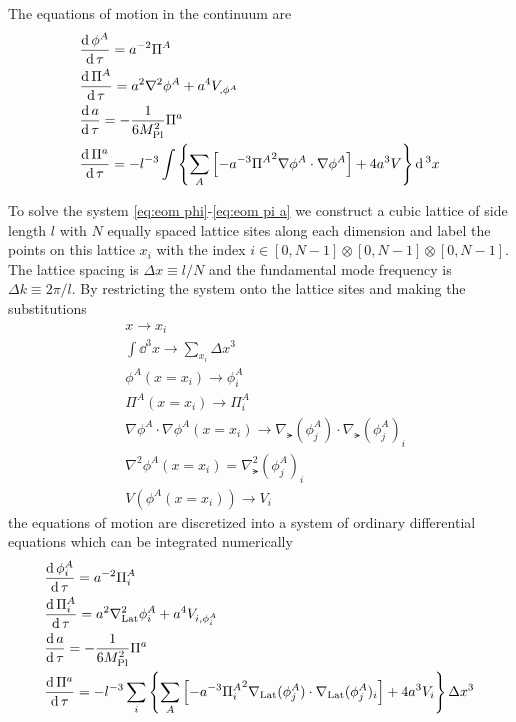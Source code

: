 The equations of motion in the continuum are
\begin{align}
  & \frac{\mathrm{d}\,\phi^A}{\mathrm{d}\,\tau} = a^{-2}\Pi^A \label{eq:eom phi} \\
  & \frac{\mathrm{d}\,\Pi^A}{\mathrm{d}\,\tau} = a^2\nabla^2\phi^A + a^4V_{,\phi^A} \\
  & \frac{\mathrm{d}\, a}{\mathrm{d}\,\tau} = -\frac{1}{6M_{\mathrm{Pl}}^2}\Pi^a \\
  & \frac{\mathrm{d}\,\Pi^a}{\mathrm{d}\,\tau} = -l^{-3}\int\left\{
  \sum_A\left[-a^{-3}{\Pi^A}^2 \nabla\phi^A\cdot\nabla\phi^A \right] +4a^3V
  \right\}\mathrm{d}\,^3x \label{eq:eom pi a}
\end{align}

To solve the system \eqref{eq:eom phi}-\eqref{eq:eom pi a} we construct a cubic lattice of side length $l$ with $N$ equally spaced lattice sites along each dimension and label the points on this lattice $x_i$ with the index $i\in[0,N-1]\otimes[0,N-1]\otimes[0,N-1]$.
The lattice spacing is $\Delta x \equiv l/N$ and the fundamental mode frequency is $\Delta k \equiv 2\pi/l$.
By restricting the system onto the lattice sites and making the substitutions
\begin{align}
  & x \to x_i \label{eq:lat sub1}\\
  & \int\dd^3x \to \sum_{x_i}\Delta x^3 \\
  & \phi^A(x=x_i) \to \phi^A_i \\
  & \Pi^A(x=x_i) \to \Pi^A_i \\
  & \nabla\phi^A\cdot\nabla\phi^A(x=x_i) \to \nabla_\lat(\phi^A_j)\cdot\nabla_\lat(\phi^A_j)_i \\
  & \nabla^2\phi^A(x=x_i) = \nabla^2_\lat(\phi^A_j)_i \\
  & V(\phi^A(x=x_i)) \to V_i \label{eq:lat sub7}
\end{align}
the equations of motion are discretized into a system of ordinary differential equations which can be integrated numerically
\begin{align}
  & \frac{\mathrm{d}\,\phi^A_i}{\mathrm{d}\,\tau} = a^{-2}\Pi^A_i \label{eq:lat eom phi} \\
  & \frac{\mathrm{d}\,\Pi^A_i}{\mathrm{d}\,\tau} = a^2\nabla^2_{\mathrm{Lat}}\phi^A_i + a^4V_{i,\phi^A_i} \\
  & \frac{\mathrm{d}\, a}{\mathrm{d}\,\tau} = -\frac{1}{6M_{\mathrm{Pl}}^2}\Pi^a \\
  & \frac{\mathrm{d}\,\Pi^a}{\mathrm{d}\,\tau} = -l^{-3}\sum_i\left\{
  \sum_A\left[-a^{-3}{\Pi^A_i}^2 \nabla_{\mathrm{Lat}}(\phi^A_j)\cdot\nabla_{\mathrm{Lat}}(\phi^A_j)_i \right] +4a^3V_i
  \right\}\Delta x^3 \label{eq:lat eom pi a}
\end{align}

